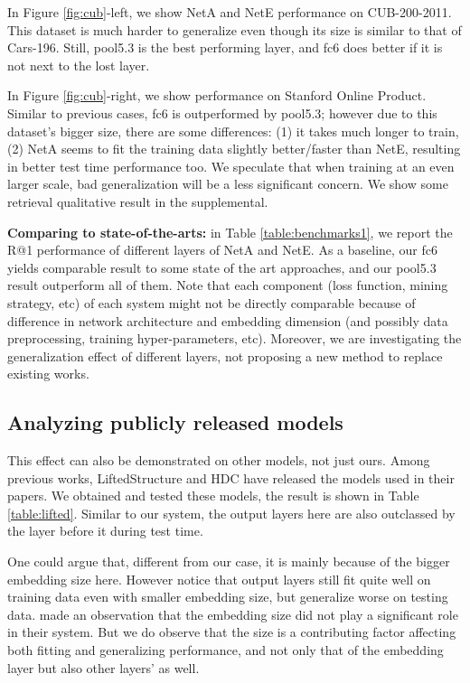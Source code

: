 \documentclass[10pt,twocolumn,letterpaper]{article}
\begin{document}
In Figure \ref{fig:cub}-left, we show NetA and NetE performance on CUB-200-2011. This dataset is much harder to generalize even though its size is similar to that of Cars-196. Still, pool5.3 is the best performing layer, and fc6 does better if it is not next to the lost layer.

In Figure \ref{fig:cub}-right, we show performance on Stanford Online Product. Similar to previous cases, fc6 is outperformed by pool5.3; however due to this dataset's bigger size, there are some differences: (1) it takes much longer to train, (2) NetA seems to fit the training data slightly better/faster than NetE, resulting in better test time performance too. We speculate that when training at an even larger scale, bad generalization will be a less significant concern. We show some retrieval qualitative result in the supplemental.

\textbf{Comparing to state-of-the-arts:} in Table \ref{table:benchmarks1}, we report the R@1 performance of different layers of NetA and NetE. As a baseline, our fc6 yields comparable result to some state of the art approaches, and our pool5.3 result outperform all of them. Note that each component (loss function, mining strategy, etc) of each system might not be directly comparable because of difference in network architecture and embedding dimension (and possibly data preprocessing, training hyper-parameters, etc). Moreover, we are investigating the generalization effect of different layers, not proposing a new method to replace existing works.






  
\subsection{Analyzing publicly released models}


This effect can also be demonstrated on other models, not just ours. Among previous works, LiftedStructure \cite{oh2016deep} and HDC \cite{yuan2016hard} have released the models used in their papers. We obtained and tested these models, the result is shown in Table \ref{table:lifted}. Similar to our system, the output layers here are also outclassed by the layer before it during test time.

One could argue that, different from our case, it is mainly because of the bigger embedding size here. However notice that output layers still fit quite well on training data even with smaller embedding size, but generalize worse on testing data. \cite{oh2016deep} made an observation that the embedding size did not play a significant role in their system. But we do observe that the size is a contributing factor affecting both fitting and generalizing performance, and not only that of the embedding layer but also other layers' as well.
\end{document}
